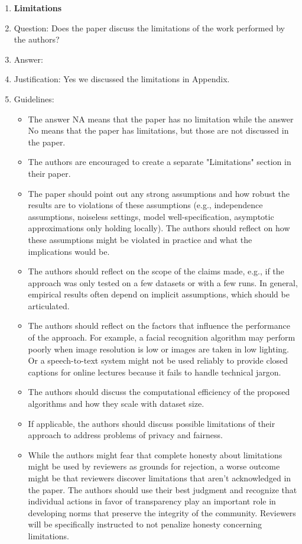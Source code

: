 \documentclass{article}
\begin{document}
\begin{enumerate}
\item {\bf Limitations}
    \item[] Question: Does the paper discuss the limitations of the work performed by the authors?
    \item[] Answer: \answerYes{} %
    \item[] Justification: Yes we discussed the limitations in Appendix.
    \item[] Guidelines:
    \begin{itemize}
        \item The answer NA means that the paper has no limitation while the answer No means that the paper has limitations, but those are not discussed in the paper. 
        \item The authors are encouraged to create a separate "Limitations" section in their paper.
        \item The paper should point out any strong assumptions and how robust the results are to violations of these assumptions (e.g., independence assumptions, noiseless settings, model well-specification, asymptotic approximations only holding locally). The authors should reflect on how these assumptions might be violated in practice and what the implications would be.
        \item The authors should reflect on the scope of the claims made, e.g., if the approach was only tested on a few datasets or with a few runs. In general, empirical results often depend on implicit assumptions, which should be articulated.
        \item The authors should reflect on the factors that influence the performance of the approach. For example, a facial recognition algorithm may perform poorly when image resolution is low or images are taken in low lighting. Or a speech-to-text system might not be used reliably to provide closed captions for online lectures because it fails to handle technical jargon.
        \item The authors should discuss the computational efficiency of the proposed algorithms and how they scale with dataset size.
        \item If applicable, the authors should discuss possible limitations of their approach to address problems of privacy and fairness.
        \item While the authors might fear that complete honesty about limitations might be used by reviewers as grounds for rejection, a worse outcome might be that reviewers discover limitations that aren't acknowledged in the paper. The authors should use their best judgment and recognize that individual actions in favor of transparency play an important role in developing norms that preserve the integrity of the community. Reviewers will be specifically instructed to not penalize honesty concerning limitations.
    \end{itemize}


\end{enumerate}
\end{document}
